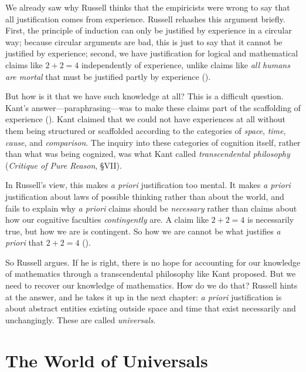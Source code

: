 \documentclass[oneside,letterpaper,12pt]{book}
\begin{document}
We already saw why Russell thinks that the empiricists were wrong to say that all justification comes from experience. Russell rehashes this argument briefly. First, the principle of induction can only be justified by experience in a circular way; because circular arguments are bad, this is just to say that it cannot be justified by experience; second, we have justification for logical and mathematical claims like $2+2=4$ independently of experience, unlike claims like \textit{all humans are mortal} that must be justified partly by experience (\pageref{instances}).

But how is it that we have such knowledge at all? This is a difficult question. Kant's answer---paraphrasing---was to make these claims part of the scaffolding of experience (\pageref{Kant}). Kant claimed that we could not have experiences at all without them being structured or scaffolded according to the categories of \textit{space}, \textit{time}, \textit{cause}, and \textit{comparison}. The inquiry into these categories of cognition itself, rather than what was being cognized, was what Kant called \textit{transcendental philosophy} (\textit{Critique of Pure Reason}, \S VII).

In Russell's view, this makes \textit{a priori} justification too mental. It makes \textit{a priori} justification about laws of possible thinking rather than about the world, and fails to explain why \textit{a priori} claims should be \textit{necessary} rather than claims about how our cognitive faculties \textit{contingently} are. A claim like $2+2=4$ is necessarily true, but how we are is contingent. So how we are cannot be what justifies \textit{a priori} that $2+2=4$ (\pageref{certainty}).

So Russell argues. If he is right, there is no hope for accounting for our knowledge of mathematics through a transcendental philosophy like Kant proposed. But we need to recover our knowledge of mathematics. How do we do that? Russell hints at the answer, and he takes it up in the next chapter: \textit{a priori} justification is about abstract entities existing outside space and time that exist necessarily and unchangingly. These are called \textit{universals}.

\hypertarget{chapter-ix.-the-world-of-universals}{%
\chapter{The World of Universals}\label{chapter-ix.-the-world-of-universals}}
\end{document}
